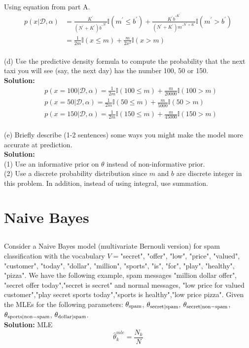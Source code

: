 \documentclass{article}
\begin{document}
Using equation from part A.
\begin{equation}
\begin{aligned}
p(x|\mathcal{D},\alpha) & = \frac{K^{'}}{(N^{'}+K^{'}) {b^{'}}^{N^{'}}} \mathbb{I} (m^{'} \leq b^{'}) + \frac{K^{'}{b^{'}}^{K^{'}}}{(N^{'}+K^{'}){m^{'}}^{N^{'}+K^{'}}} \mathbb{I} (m^{'} > b^{'}) \\
& = \frac{1}{2m} \mathbb{I} (x \leq m) + \frac{m}{2x^2} \mathbb{I} (x > m)
\end{aligned}
\end{equation}
\\
(d) Use the predictive density formula to compute the probability  that the next taxi you will see (say, the next day) has the number 100, 50 or 150. \\
\textbf{Solution:} \\
\begin{equation}
\begin{aligned}
& p(x= 100|\mathcal{D},\alpha)   = \frac{1}{2m} \mathbb{I} (100 \leq m) + \frac{m}{20000} \mathbb{I} (100 > m) \\
& p(x= 50|\mathcal{D},\alpha)   = \frac{1}{2m} \mathbb{I} (50 \leq m) + \frac{m}{5000} \mathbb{I} (50 > m) \\
& p(x= 150|\mathcal{D},\alpha)  = \frac{1}{2m} \mathbb{I} (150 \leq m) + \frac{m}{45000} \mathbb{I} (150 > m) 
\end{aligned}
\end{equation}
\\
(e) Briefly describe (1-2 sentences) some ways you might make the model more accurate at prediction. \\
\textbf{Solution:} \\
(1) Use an informative prior on $\theta$ instead of non-informative prior.\\
(2) Use a discrete probability distribution since $m$ and $b$ are discrete integer in this problem. In addition, instead of using integral, use summation.

\newpage
\section{Naive Bayes}
\subsection{}
Consider a Naive Bayes model (multivariate Bernouli version) for spam classification with the vocabulary $V=$"secret", "offer", "low",  "price", "valued", "customer", "today", "dollar", "million", "sports",  "is", "for", "play", "healthy", "pizza". We have the following example, spam messages "million dollar offer", "secret offer today","secret is secret" and normal messages, "low price for valued customer","play secret sports today","sports is healthy","low price pizza". Given the MLEs for the following parameters: $\theta_{\rm spam}$, $\theta_{\rm secret | \rm spam}$, $\theta_{\rm secret | \rm non-spam}$, $\theta_{\rm sports | \rm non-spam}$, $\theta_{\rm dollar | \rm spam}$.
\\
\textbf{Solution:}
MLE
\begin{equation}
    \hat{\theta}_{k}^{mle} = \frac{N_{k}}{N}
\end{equation}
\end{document}
